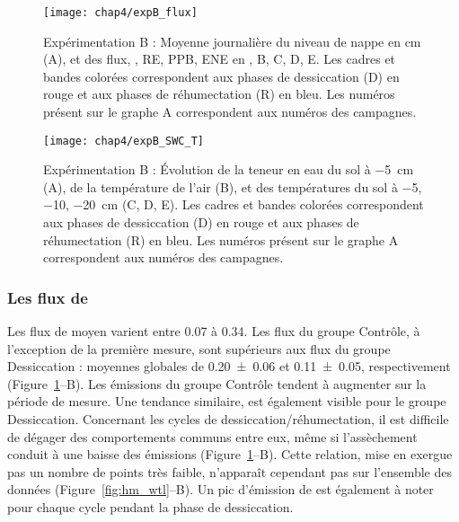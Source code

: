 

\begin{figure}
\centering
\texttt{[image: chap4/expB\_flux]}
\caption{Expérimentation B : Moyenne journalière du niveau de nappe en cm (A), et des flux, \chh, RE, PPB, ENE en \si{\uml}, B, C, D, E. Les cadres et bandes colorées correspondent aux phases de dessiccation (D) en rouge et aux phases de réhumectation (R) en bleu. Les numéros présent sur le graphe A correspondent aux numéros des campagnes.}
\label{fig:HMty}
\end{figure}

\begin{figure}
\centering
\texttt{[image: chap4/expB\_SWC\_T]}
\caption{Expérimentation B : Évolution de la teneur en eau du sol à \SI{-5}{\centi\metre} (A), de la température de l'air (B), et des températures du sol à \num{-5}, \num{-10}, \SI{-20}{\centi\metre} (C, D, E). Les cadres et bandes colorées correspondent aux phases de dessiccation (D) en rouge et aux phases de réhumectation (R) en bleu. Les numéros présent sur le graphe A correspondent aux numéros des campagnes.}
\label{fig:HMty_T}
\end{figure}


\subsubsection{Les flux de \chh}

Les flux de \chh moyen varient entre \num{0.07} à \SI{0.34}{\uml}.
Les flux du groupe Contrôle, à l'exception de la première mesure, sont supérieurs aux flux du groupe Dessiccation : moyennes globales de \num{0.20(006)} et \SI{0.11(005)}{\uml}, respectivement (Figure~\ref{fig:HMty}--B).
Les émissions du groupe Contrôle tendent à augmenter sur la période de mesure.
Une tendance similaire, est également visible pour le groupe Dessiccation.
Concernant les cycles de dessiccation/réhumectation, il est difficile de dégager des comportements communs entre eux, même si l'assèchement conduit à une baisse des émissions (Figure~\ref{fig:HMty}--B).
Cette relation, mise en exergue pas un nombre de points très faible, n’apparaît cependant pas sur l'ensemble des données (Figure~\ref{fig:hm_wtl}--B).
Un pic d'émission de \chh est également à noter pour chaque cycle pendant la phase de dessiccation.


